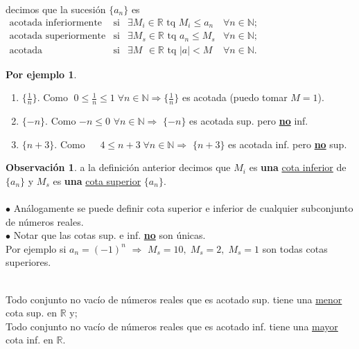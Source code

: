 \documentclass{article}
\theoremstyle{definition}
\theoremstyle{definition}
\newtheorem*{obs}{Observación}
\newtheorem*{ej}{Por ejemplo}
\theoremstyle{remark}
\begin{document}
\pagebreak
\begin{defi}
  decimos que la sucesión $\{a_n\}$ es \\
  $\begin{array}{clll} 
    \text{acotada inferiormente} & \text{si} & \exists M_i \in \mathbb{R} \text{ tq } M_i \leq a_n  &  \forall n \in \mathbb{N} ;  \\ 
    \text{acotada superiormente} & \text{si} & \exists M_s \in \mathbb{R} \text{ tq } a_n \leq M_s & \forall n \in \mathbb{N};  \\
    \text{acotada} & \text{si} & \exists M_{\phantom{s}}\in\mathbb{R} \text{ tq } |a|<M & \forall n \in \mathbb{N}. 
  \end{array}$
\end{defi}
\begin{ej} \; \\
  \begin{enumerate}
    \item $\{\frac{1}{n}\}$.\;\;\;\; Como $\phantom{.}0\leq \frac{1}{n} \leq 1 \; \forall n\in \mathbb{N} \Rightarrow $$\{\frac{1}{n}\}$ es acotada (puedo tomar $M=1$).
  \item $\{-n\}$. \;   Como $-n \leq 0$ \;\;\;\;\; $\forall n \in \mathbb{N} \Rightarrow $ $\{-n\}$ \; \; es acotada sup. pero \textbf{\underline{no}} inf. 
  \item $\{n+3\}$. Como $\phantom{-}4 \leq n+3 \; \forall n \in \mathbb{N} \Rightarrow$ $\{n+3\}$ es acotada inf. pero \textbf{\underline{no}} sup.

  \end{enumerate}
\end{ej}

\begin{obs}
  a la definición anterior decimos que $M_i$ es \textbf{una }\underline{cota inferior} de $\{a_n\}$ y $M_s$ es \textbf{una} \underline{cota superior} $\{a_n\}$. \\ \\
$\bullet$ Análogamente se puede definir cota superior e inferior de cualquier subconjunto de números reales. \\
$\bullet$ Notar que las cotas sup. e inf. \textbf{\underline{no}} son únicas. \\
Por ejemplo si $a_n=(-1)^n$ $\Rightarrow$ $M_s=10,\;$$M_s=2,\;$$M_s=1$ son todas cotas superiores.
\end{obs}

\begin{axi} \; \\
  Todo conjunto no vacío de números reales que es acotado sup. tiene una \underline{menor} cota sup. en $\mathbb{R}$ y; \\
  Todo conjunto no vacío de números reales que es acotado inf. tiene una \underline{mayor} cota inf. en $\mathbb{R}$.
\end{axi}
\end{document}
